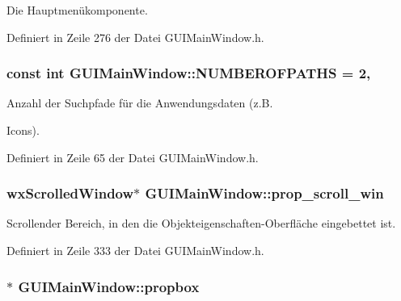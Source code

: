 Die Hauptmenükomponente. 



Definiert in Zeile 276 der Datei G\-U\-I\-Main\-Window.\-h.

\hypertarget{classGUIMainWindow_ae3eb6747c8ffa9e20e54c2d34f58bd40}{
\subsubsection[{N\-U\-M\-B\-E\-R\-O\-F\-P\-A\-T\-H\-S}]{\setlength{\rightskip}{0pt plus 5cm}const int G\-U\-I\-Main\-Window\-::\-N\-U\-M\-B\-E\-R\-O\-F\-P\-A\-T\-H\-S = 2\hspace{0.3cm}{\ttfamily [static]}, {\ttfamily [protected]}}}\label{classGUIMainWindow_ae3eb6747c8ffa9e20e54c2d34f58bd40}


Anzahl der Suchpfade für die Anwendungsdaten (z.\-B. 

Icons). 

Definiert in Zeile 65 der Datei G\-U\-I\-Main\-Window.\-h.

\hypertarget{classGUIMainWindow_a1c120efb232cf3d371a3a6231619b808}{
\subsubsection[{prop\-\_\-scroll\-\_\-win}]{\setlength{\rightskip}{0pt plus 5cm}wx\-Scrolled\-Window$\ast$ G\-U\-I\-Main\-Window\-::prop\-\_\-scroll\-\_\-win\hspace{0.3cm}{\ttfamily [private]}}}\label{classGUIMainWindow_a1c120efb232cf3d371a3a6231619b808}


Scrollender Bereich, in den die Objekteigenschaften-\/\-Oberfläche eingebettet ist. 



Definiert in Zeile 333 der Datei G\-U\-I\-Main\-Window.\-h.

\hypertarget{classGUIMainWindow_a4959774563543927a492bf06e441920e}{
\subsubsection[{propbox}]{$\ast$ G\-U\-I\-Main\-Window\-::propbox\hspace{0.3cm}{\ttfamily [private]}}}\label{classGUIMainWindow_a4959774563543927a492bf06e441920e}


